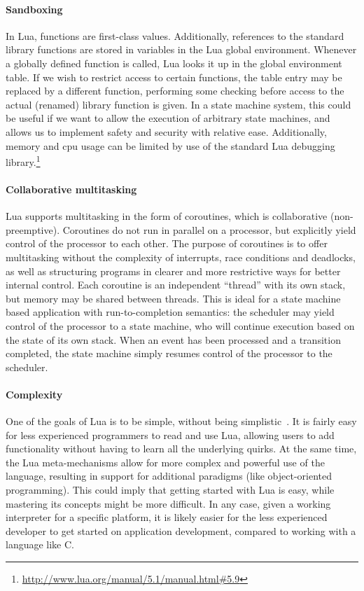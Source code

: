 \paragraph{Sandboxing}
In Lua, functions are first-class values. Additionally, references to the standard library functions are stored in variables in the Lua global environment. Whenever a globally defined function is called, Lua looks it up in the global environment table. If we wish to restrict access to certain functions, the table entry may be replaced by a different function, performing some checking before access to the actual (renamed) library function is given. In a state machine system, this could be useful if we want to allow the execution of arbitrary state machines, and allows us to implement safety and security with relative ease. Additionally, memory and \gls{cpu} usage can be limited by use of the standard Lua debugging library.\footnote{\url{http://www.lua.org/manual/5.1/manual.html\#5.9}}

\paragraph{Collaborative multitasking}
Lua supports multitasking in the form of coroutines, which is collaborative (non-preemptive). Coroutines do not run in parallel on a processor, but explicitly yield control of the processor to each other. The purpose of coroutines is to offer multitasking without the complexity of interrupts, race conditions and deadlocks, as well as structuring programs in clearer and more restrictive ways for better internal control. Each coroutine is an independent ``thread'' with its own stack, but memory may be shared between threads. This is ideal for a state machine based application with run-to-completion semantics: the scheduler may yield control of the processor to a state machine, who will continue execution based on the state of its own stack. When an event has been processed and a transition completed, the state machine simply resumes control of the processor to the scheduler.

\paragraph{Complexity}
One of the goals of Lua is to be simple, without being simplistic~\cite{article:the_implementation_of_lua}. It is fairly easy for less experienced programmers to read and use Lua, allowing users to add functionality without having to learn all the underlying quirks. At the same time, the Lua meta-mechanisms allow for more complex and powerful use of the language, resulting in support for additional paradigms (like object-oriented programming). This could imply that getting started with Lua is easy, while mastering its concepts might be more difficult. In any case, given a working interpreter for a specific platform, it is likely easier for the less experienced developer to get started on application development, compared to working with a language like C.


